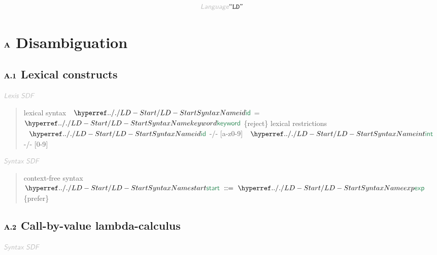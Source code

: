 \begin{displaymath}
\KEY{Language} \STRING{LD}
\end{displaymath}

\section*{$\SECT{A}$ Disambiguation}\hypertarget{secta-disambiguation}{}\label{secta-disambiguation}

\subsection*{$\SECT{A.1}$ Lexical constructs}\hypertarget{secta1-lexical-constructs}{}\label{secta1-lexical-constructs}

$\KEY{Lexis SDF}$

\begin{quote}
lexical syntax\newline
  $\SHADE{~~\SYNHYPER{../.}{LD-Start}{id}}$ = $\SHADE{\SYNHYPER{../.}{LD-Start}{keyword}}$ \{reject\}\newline
\newline
lexical restrictions\newline
  $\SHADE{~~\SYNHYPER{../.}{LD-Start}{id}}$  -/- {[}a-z0-9{]}\newline
  $\SHADE{~~\SYNHYPER{../.}{LD-Start}{int}}$ -/- {[}0-9{]}
\end{quote}

$\KEY{Syntax SDF}$

\begin{quote}
context-free syntax\newline
$\SHADE{ \SYNHYPER{../.}{LD-Start}{start}  ~ ::= ~  \SYNHYPER{../.}{LD-Start}{exp}}$ \{prefer\}
\end{quote}

\subsection*{$\SECT{A.2}$ Call-by-value lambda-calculus}\hypertarget{secta2-call-by-value-lambda-calculus}{}\label{secta2-call-by-value-lambda-calculus}

$\KEY{Syntax SDF}$

